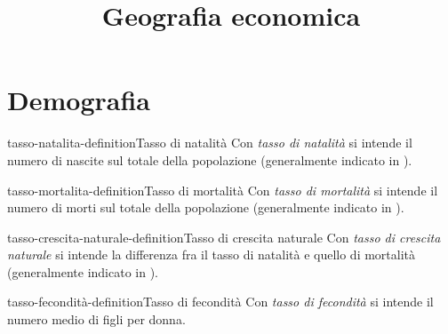 \documentclass[preview]{standalone}
\begin{document}
\title{Geografia economica}
\genpage



\section{Demografia}

\begin{snippetdefinition}{tasso-natalita-definition}{Tasso di natalità}
    Con \textit{tasso di natalità}
    si intende il numero di nascite sul totale della popolazione
    (generalmente indicato in \textperthousand).
\end{snippetdefinition}

\begin{snippetdefinition}{tasso-mortalita-definition}{Tasso di mortalità}
    Con \textit{tasso di mortalità}
    si intende il numero di morti sul totale della popolazione
    (generalmente indicato in \textperthousand).
\end{snippetdefinition}

\begin{snippetdefinition}{tasso-crescita-naturale-definition}{Tasso di crescita naturale}
    Con \textit{tasso di crescita naturale}
    si intende la differenza fra il tasso di natalità e quello di mortalità
    (generalmente indicato in \textperthousand).
\end{snippetdefinition}

\begin{snippetdefinition}{tasso-fecondità-definition}{Tasso di fecondità}
    Con \textit{tasso di fecondità}
    si intende il numero medio di figli per donna.
\end{snippetdefinition}
\end{document}

